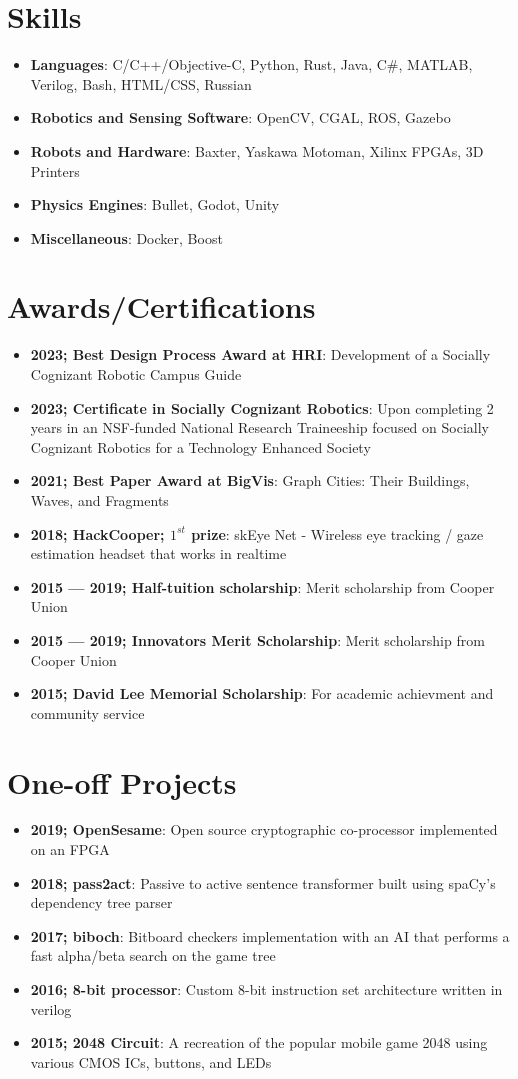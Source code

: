 \documentclass[letterpaper,11pt]{article}
\newcommand{\resumeItem}[2]{
\item\small{
		\textbf{#1}{: #2 \vspace{-2pt}}
	}
}
\newcommand{\resumeSubItem}[2]{\resumeItem{#1}{#2}\vspace{-4pt}}
\newcommand{\resumeSubHeadingListStart}{\begin{itemize}[leftmargin=*,label=]}
\newcommand{\resumeSubHeadingListEnd}{\end{itemize}}
\begin{document}
\section{Skills}
\resumeSubHeadingListStart
\resumeSubItem{Languages}
{C/C++/Objective-C, Python, Rust, Java, C\#, MATLAB, Verilog, Bash, HTML/CSS, Russian}
\resumeSubItem{Robotics and Sensing Software}{OpenCV, CGAL, ROS, Gazebo}
\resumeSubItem{Robots and Hardware}{Baxter, Yaskawa Motoman, Xilinx FPGAs, 3D Printers}
\resumeSubItem{Physics Engines}{Bullet, Godot, Unity}
\resumeSubItem{Miscellaneous}{Docker, Boost}
\resumeSubHeadingListEnd

\section{Awards/Certifications}
\resumeSubHeadingListStart
\resumeSubItem{2023; Best Design Process Award at HRI}{Development of a Socially Cognizant Robotic Campus Guide}
\resumeSubItem{2023; Certificate in Socially Cognizant Robotics}{Upon completing 2 years in an NSF-funded National Research Traineeship focused on Socially Cognizant Robotics for a Technology Enhanced Society}
\resumeSubItem{2021; Best Paper Award at BigVis}{Graph Cities: Their Buildings, Waves, and Fragments}
\resumeSubItem{2018; HackCooper; $1^{st}$ prize}
{skEye Net - Wireless eye tracking / gaze estimation headset that works in realtime}
\resumeSubItem{2015 --- 2019; Half-tuition scholarship}{Merit scholarship from Cooper Union}
\resumeSubItem{2015 --- 2019; Innovators Merit Scholarship}{Merit scholarship from Cooper Union}
\resumeSubItem{2015; David Lee Memorial Scholarship}{For academic achievment and community service}
\resumeSubHeadingListEnd

\section{One-off Projects}
\resumeSubHeadingListStart
\resumeSubItem{2019; OpenSesame}
{Open source cryptographic co-processor implemented on an FPGA}
\resumeSubItem{2018; pass2act}
{Passive to active sentence transformer built using spaCy's dependency tree parser}
\resumeSubItem{2017; biboch}
{Bitboard checkers implementation with an AI that performs a fast alpha/beta search on the game tree}
\resumeSubItem{2016; 8-bit processor}
{Custom 8-bit instruction set architecture written in verilog}
\resumeItem{2015; 2048 Circuit}
{A recreation of the popular mobile game 2048 using various CMOS ICs, buttons, and LEDs}
\resumeSubHeadingListEnd
\end{document}
